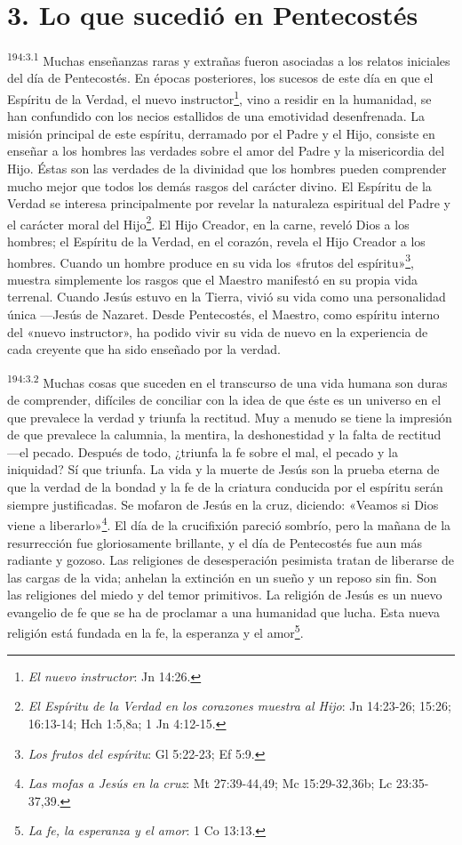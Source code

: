 \section*{3. Lo que sucedió en Pentecostés}
\par
\textsuperscript{194:3.1} Muchas enseñanzas raras y extrañas fueron asociadas a los relatos iniciales del día de Pentecostés. En épocas posteriores, los sucesos de este día en que el Espíritu de la Verdad, el nuevo instructor\footnote{\textit{El nuevo instructor}: Jn 14:26.}, vino a residir en la humanidad, se han confundido con los necios estallidos de una emotividad desenfrenada. La misión principal de este espíritu, derramado por el Padre y el Hijo, consiste en enseñar a los hombres las verdades sobre el amor del Padre y la misericordia del Hijo. Éstas son las verdades de la divinidad que los hombres pueden comprender mucho mejor que todos los demás rasgos del carácter divino. El Espíritu de la Verdad se interesa principalmente por revelar la naturaleza espiritual del Padre y el carácter moral del Hijo\footnote{\textit{El Espíritu de la Verdad en los corazones muestra al Hijo}: Jn 14:23-26; 15:26; 16:13-14; Hch 1:5,8a; 1 Jn 4:12-15.}. El Hijo Creador, en la carne, reveló Dios a los hombres; el Espíritu de la Verdad, en el corazón, revela el Hijo Creador a los hombres. Cuando un hombre produce en su vida los «frutos del espíritu»\footnote{\textit{Los frutos del espíritu}: Gl 5:22-23; Ef 5:9.}, muestra simplemente los rasgos que el Maestro manifestó en su propia vida terrenal. Cuando Jesús estuvo en la Tierra, vivió su vida como una personalidad única ---Jesús de Nazaret. Desde Pentecostés, el Maestro, como espíritu interno del «nuevo instructor», ha podido vivir su vida de nuevo en la experiencia de cada creyente que ha sido enseñado por la verdad.

\par
\textsuperscript{194:3.2} Muchas cosas que suceden en el transcurso de una vida humana son duras de comprender, difíciles de conciliar con la idea de que éste es un universo en el que prevalece la verdad y triunfa la rectitud. Muy a menudo se tiene la impresión de que prevalece la calumnia, la mentira, la deshonestidad y la falta de rectitud ---el pecado. Después de todo, ¿triunfa la fe sobre el mal, el pecado y la iniquidad? Sí que triunfa. La vida y la muerte de Jesús son la prueba eterna de que la verdad de la bondad y la fe de la criatura conducida por el espíritu serán siempre justificadas. Se mofaron de Jesús en la cruz, diciendo: «Veamos si Dios viene a liberarlo»\footnote{\textit{Las mofas a Jesús en la cruz}: Mt 27:39-44,49; Mc 15:29-32,36b; Lc 23:35-37,39.}. El día de la crucifixión pareció sombrío, pero la mañana de la resurrección fue gloriosamente brillante, y el día de Pentecostés fue aun más radiante y gozoso. Las religiones de desesperación pesimista tratan de liberarse de las cargas de la vida; anhelan la extinción en un sueño y un reposo sin fin. Son las religiones del miedo y del temor primitivos. La religión de Jesús es un nuevo evangelio de fe que se ha de proclamar a una humanidad que lucha. Esta nueva religión está fundada en la fe, la esperanza y el amor\footnote{\textit{La fe, la esperanza y el amor}: 1 Co 13:13.}.

